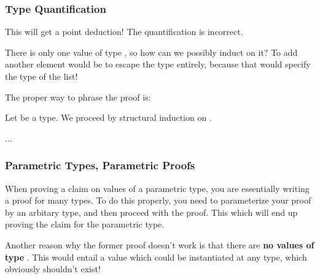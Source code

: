 \documentclass[aspectratio=169, handout]{beamer}
\begin{document}
\begin{frame}[fragile]
  \frametitle{Type Quantification}

  This will get a point deduction! The quantification is incorrect.

  \pause
  \vspace{\fill}

  There is only one value of type , so how can we possibly induct
  on it? To add another element would be to escape the type entirely, because
  that would specify the type of the list!

  \pause
  \vspace{\fill}

  The proper way to phrase the proof is:

  \pause
  \vspace{\fill}

  Let  be a type. We proceed by structural induction on .

  \vspace{\fill}

  ...

  \vspace{\fill}

\end{frame}

\begin{frame}[fragile]
  \frametitle{Parametric Types, Parametric Proofs}

  When proving a claim on values of a parametric type, you are essentially writing
  a proof for many types. To do this properly, you need to parameterize your proof
  by an arbitary type, and then proceed with the proof. This which will end up
  proving the claim for the parametric type.

  \pause
  \vspace{\fill}

  Another reason why the former proof doesn't work is that there are
  \textbf{no values of type }. This would entail a value which could
  be instantiated at any type, which obviously shouldn't exist!
\end{frame}
\end{document}
